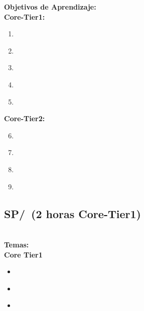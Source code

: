 \noindent \textbf{Objetivos de Aprendizaje:}\\
\noindent \textbf{Core-Tier1:}
\begin{enumerate}
	\setcounter{enumi}{0}
	\item \SPSocialContextLODescribePositive\xspace[\SPSocialContextLODescribePositiveLevel]\label{sec:BOK:SPSocialContextLODescribePositive}
	\item \SPSocialContextLOIdentifyDevelopers\xspace[\SPSocialContextLOIdentifyDevelopersLevel]\label{sec:BOK:SPSocialContextLOIdentifyDevelopers}
	\item \SPSocialContextLOInterpretThe\xspace[\SPSocialContextLOInterpretTheLevel]\label{sec:BOK:SPSocialContextLOInterpretThe}
	\item \SPSocialContextLOEvaluateTheA\xspace[\SPSocialContextLOEvaluateTheALevel]\label{sec:BOK:SPSocialContextLOEvaluateTheA}
	\item \SPSocialContextLOSummarizeTheSocial\xspace[\SPSocialContextLOSummarizeTheSocialLevel]\label{sec:BOK:SPSocialContextLOSummarizeTheSocial}
\end{enumerate}
\noindent \textbf{Core-Tier2:}
\begin{enumerate}
	\setcounter{enumi}{5}
	\item \SPSocialContextLODiscussHowServes\xspace[\SPSocialContextLODiscussHowServesLevel]\label{sec:BOK:SPSocialContextLODiscussHowServes}
	\item \SPSocialContextLOAnalyzeTheCons\xspace[\SPSocialContextLOAnalyzeTheConsLevel]\label{sec:BOK:SPSocialContextLOAnalyzeTheCons}
	\item \SPSocialContextLODescribeTheTheOf\xspace[\SPSocialContextLODescribeTheTheOfLevel]\label{sec:BOK:SPSocialContextLODescribeTheTheOf}
	\item \SPSocialContextLOExplainTheContext\xspace[\SPSocialContextLOExplainTheContextLevel]\label{sec:BOK:SPSocialContextLOExplainTheContext}
\end{enumerate}


\subsection{SP/\SPAnalyticalTools~(2 horas Core-Tier1)}\label{sec:BOK:SPAnalyticalTools}
\SPAnalyticalToolsDescription\\
\noindent \textbf{Temas:}\\
\noindent \textbf{Core Tier1}
\begin{itemize}
	\item \SPAnalyticalToolsTopicEthical\label{sec:BOK:SPAnalyticalToolsTopicEthical}
	\item \SPAnalyticalToolsTopicEthicalTheories\label{sec:BOK:SPAnalyticalToolsTopicEthicalTheories}
	\item \SPAnalyticalToolsTopicMoral\label{sec:BOK:SPAnalyticalToolsTopicMoral}
\end{itemize}


